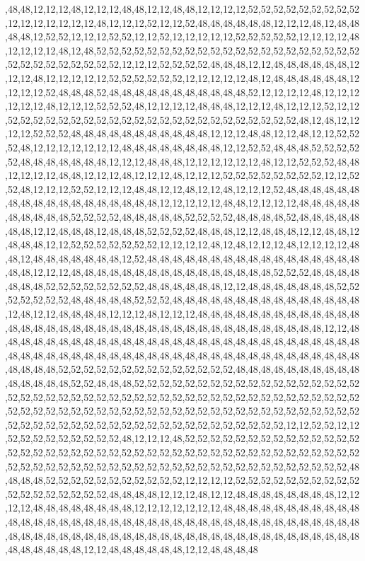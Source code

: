,48,48,12,12,12,48,12,12,12,48,48,12,12,48,48,12,12,12,12,52,52,52,52,52,52,52,52,52,12,12,12,12,12,12,12,48,12,12,12,52,12,12,52,48,48,48,48,48,48,12,12,12,48,12,48,48,48,48,12,52,52,12,12,12,52,52,12,12,52,12,12,12,12,12,52,52,52,52,52,12,12,12,12,48,12,12,12,12,48,12,48,52,52,52,52,52,52,52,52,52,52,52,52,52,52,52,52,52,52,52,52,52,52,52,52,52,52,52,52,52,52,12,12,12,52,52,52,52,48,48,48,12,12,48,48,48,48,48,48,12,12,12,48,12,12,12,12,12,52,52,52,52,52,52,12,12,12,12,12,48,12,48,48,48,48,48,48,12,12,12,12,52,48,48,48,52,48,48,48,48,48,48,48,48,48,48,48,52,12,12,12,12,48,12,12,12,12,12,12,48,12,12,12,52,52,52,48,12,12,12,12,48,48,48,12,12,12,48,12,12,12,52,12,12,52,52,52,52,52,52,52,52,52,52,52,52,52,52,52,52,52,52,52,52,52,52,52,48,12,48,12,12,12,12,52,52,52,48,48,48,48,48,48,48,48,48,48,48,12,12,12,48,48,12,12,48,12,12,52,52,52,48,12,12,12,12,12,12,12,48,48,48,48,48,48,48,48,12,12,52,52,48,48,48,52,52,52,52,52,48,48,48,48,48,48,48,12,12,12,48,48,48,12,12,12,12,12,12,48,12,12,52,52,52,48,48,12,12,12,12,48,48,12,12,12,48,12,12,12,48,12,12,12,52,52,52,52,52,52,52,52,12,12,52,52,48,12,12,12,52,52,12,12,12,48,48,12,12,48,12,12,48,12,12,12,52,48,48,48,48,48,48,48,48,48,48,48,48,48,48,48,48,48,48,12,12,12,12,12,48,48,12,12,12,12,48,48,48,48,48,48,48,48,48,48,52,52,52,52,48,48,48,48,48,52,52,52,52,48,48,48,48,52,48,48,48,48,48,48,48,12,12,48,48,48,12,48,48,48,52,52,52,52,48,48,48,12,12,48,48,48,12,12,48,48,12,48,48,48,12,12,52,52,52,52,52,52,52,12,12,12,12,48,12,48,12,12,12,48,12,12,12,12,48,48,12,48,48,48,48,48,48,48,12,52,48,48,48,48,48,48,48,48,48,48,48,48,48,48,48,48,48,48,48,12,12,12,48,48,48,48,48,48,48,48,48,48,48,48,48,48,48,48,52,52,52,48,48,48,48,48,48,48,52,52,52,52,52,52,52,52,48,48,48,48,48,48,12,12,48,48,48,48,48,48,48,52,52,52,52,52,52,52,48,48,48,48,48,52,52,52,48,48,48,48,48,48,48,48,48,48,48,48,48,48,48,12,48,12,12,48,48,48,48,12,12,12,48,12,12,12,48,48,48,48,48,48,48,48,48,48,48,48,48,48,48,48,48,48,48,48,48,48,48,48,48,48,48,48,48,48,48,48,48,48,48,48,48,48,12,12,48,48,48,48,48,48,48,48,48,48,48,48,48,48,48,48,48,48,48,48,48,48,48,48,48,48,48,48,48,48,48,48,48,48,48,48,48,48,48,48,48,48,48,48,48,48,48,48,48,48,48,48,48,48,48,48,48,48,48,48,48,52,52,52,52,52,52,52,52,52,52,52,52,52,52,48,48,48,48,48,48,48,48,48,48,48,48,48,48,48,52,52,48,48,48,52,52,52,52,52,52,52,52,52,52,52,52,52,52,52,52,52,52,52,52,52,52,52,52,52,52,52,52,52,52,52,52,52,52,52,52,52,52,52,52,52,52,52,52,52,52,52,52,52,52,52,52,52,52,52,52,52,52,52,52,52,52,52,52,52,52,52,52,52,52,52,52,52,52,52,52,52,52,52,52,52,52,52,52,52,52,52,52,52,52,52,52,52,52,52,52,12,12,52,52,12,12,52,52,52,52,52,52,52,52,52,48,12,12,12,48,52,52,52,52,52,52,52,52,52,52,52,52,52,52,52,52,52,52,52,52,52,52,52,52,52,52,52,52,52,52,52,52,52,52,52,52,52,52,52,52,52,52,52,52,52,52,52,52,52,52,52,52,52,52,52,52,52,52,52,52,52,52,52,52,52,52,52,52,52,48,48,48,48,52,52,52,52,52,52,52,52,52,52,52,12,12,12,12,52,52,52,52,52,52,52,52,52,52,52,52,52,52,52,52,52,52,48,48,48,48,12,12,12,48,12,12,48,48,48,48,48,48,48,48,12,12,12,12,48,48,48,48,48,48,48,48,12,12,12,12,12,12,12,48,48,48,48,48,48,48,48,48,48,48,48,48,48,48,48,48,48,48,48,48,48,48,48,48,48,48,48,48,48,48,48,48,48,48,48,48,48,48,48,48,48,48,48,48,48,48,48,48,48,48,48,48,48,48,48,48,48,48,48,48,48,48,48,48,48,48,48,48,48,48,48,48,12,12,48,48,48,48,48,48,12,12,48,48,48,48